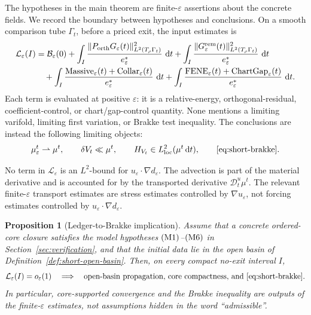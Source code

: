 \documentclass[11pt]{article}
\newtheorem{proposition}[theorem]{Proposition}
\theoremstyle{definition}
\newcommand{\dd}{\,\mathrm d}
\newcommand{\eps}{\varepsilon}
\newcommand{\estar}{e_\varepsilon^\ast}
\newcommand{\Basin}{\mathcal B}
\newcommand{\Ledger}{\mathcal L}
\begin{document}
The hypotheses in the main theorem are finite-\(\eps\) assertions about the
concrete fields.  We record the boundary between hypotheses and conclusions.
On a smooth comparison tube
\(\Gamma_t\), before a priced exit, the input estimates is
\[
\begin{aligned}
        \Ledger_\eps(I)
        &=
        \Basin_\eps(0)
        +
        \int_I
        \frac{\|P_{\rm orth}G_\eps(t)\|_{L^2(T_{\rho}\Gamma_t)}^2}
             {\estar}\,\dd t
        +
        \int_I
        \frac{\|G_\eps^{\rm rem}(t)\|_{L^2(T_{\rho}\Gamma_t)}^2}
             {\estar}\,\dd t
\\
        &\quad+
        \int_I
        \frac{{\rm Massive}_\eps(t)+{\rm Collar}_\eps(t)}
             {\estar}\,\dd t
        +
        \int_I
        \frac{{\rm FENE}_\eps(t)+{\rm ChartGap}_\eps(t)}
             {\estar}\,\dd t .
\end{aligned}
\]
Each term is evaluated at positive \(\eps\): it is a relative-energy,
orthogonal-residual, coefficient-control, or chart/gap-control quantity.  None
mentions a limiting varifold, limiting first variation, or Brakke test
inequality.  The conclusions are instead the following limiting objects:
\[
        \mu_\eps^t\rightharpoonup \mu^t,\qquad
        \delta V_t\ll \mu^t,\qquad
        H_{V_t}\in L^2_{\rm loc}(\mu^t\dd t),\qquad
       \eqref{eq:short-brakke}.
\]

No term in \(\Ledger_\eps\) is an \(L^2\)-bound for
\(u_\eps\cdot\nabla d_\eps\).  The advection is part of the material
derivative and is accounted for by the transported derivative
\(\mathcal D_t^u\mu^t\).  The relevant finite-\(\eps\) transport estimates are
stress estimates controlled by \(\nabla u_\eps\), not forcing estimates
controlled by \(u_\eps\cdot\nabla d_\eps\).

\begin{proposition}[Ledger-to-Brakke implication]
\label{prop:no-circularity-ledger}
Assume that a concrete ordered-core closure satisfies the model hypotheses
\({\rm (M1)}\)--\({\rm (M6)}\) in Section~\ref{sec:verification}, and that the
initial data lie in the open basin of Definition~\ref{def:short-open-basin}.
Then, on every compact no-exit interval \(I\),
\[
        \Ledger_\eps(I)=o_\eps(1)
        \quad\Longrightarrow\quad
        \text{open-basin propagation, core compactness, and }
        \eqref{eq:short-brakke}.
\]
In particular, core-supported convergence and the Brakke inequality are
outputs of the finite-\(\eps\) estimates, not assumptions hidden in the word
``admissible''.
\end{proposition}
\end{document}
